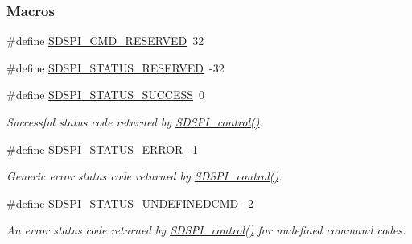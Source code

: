 \subsubsection*{Macros}
\begin{DoxyCompactItemize}
\item 
\#define \hyperlink{_s_d_s_p_i_8h_a2912b6627b0f64de874048a5ebea2a85}{S\+D\+S\+P\+I\+\_\+\+C\+M\+D\+\_\+\+R\+E\+S\+E\+R\+V\+E\+D}~32
\item 
\#define \hyperlink{_s_d_s_p_i_8h_a3037f55e94a7ef536986738c721a690a}{S\+D\+S\+P\+I\+\_\+\+S\+T\+A\+T\+U\+S\+\_\+\+R\+E\+S\+E\+R\+V\+E\+D}~-\/32
\item 
\#define \hyperlink{_s_d_s_p_i_8h_a5ebecb6ddc00b47b11c1d5ab3ce04108}{S\+D\+S\+P\+I\+\_\+\+S\+T\+A\+T\+U\+S\+\_\+\+S\+U\+C\+C\+E\+S\+S}~0
\begin{DoxyCompactList}\small\item\em Successful status code returned by \hyperlink{_s_d_s_p_i_8h_a541a1db109382fe090ed7a9209a34f61}{S\+D\+S\+P\+I\+\_\+control()}. \end{DoxyCompactList}\item 
\#define \hyperlink{_s_d_s_p_i_8h_a61e58103fc719d0afafddfc7dd11b49d}{S\+D\+S\+P\+I\+\_\+\+S\+T\+A\+T\+U\+S\+\_\+\+E\+R\+R\+O\+R}~-\/1
\begin{DoxyCompactList}\small\item\em Generic error status code returned by \hyperlink{_s_d_s_p_i_8h_a541a1db109382fe090ed7a9209a34f61}{S\+D\+S\+P\+I\+\_\+control()}. \end{DoxyCompactList}\item 
\#define \hyperlink{_s_d_s_p_i_8h_af65a39f487c0da299c3e0fc77a70a4c3}{S\+D\+S\+P\+I\+\_\+\+S\+T\+A\+T\+U\+S\+\_\+\+U\+N\+D\+E\+F\+I\+N\+E\+D\+C\+M\+D}~-\/2
\begin{DoxyCompactList}\small\item\em An error status code returned by \hyperlink{_s_d_s_p_i_8h_a541a1db109382fe090ed7a9209a34f61}{S\+D\+S\+P\+I\+\_\+control()} for undefined command codes. \end{DoxyCompactList}\end{DoxyCompactItemize}
